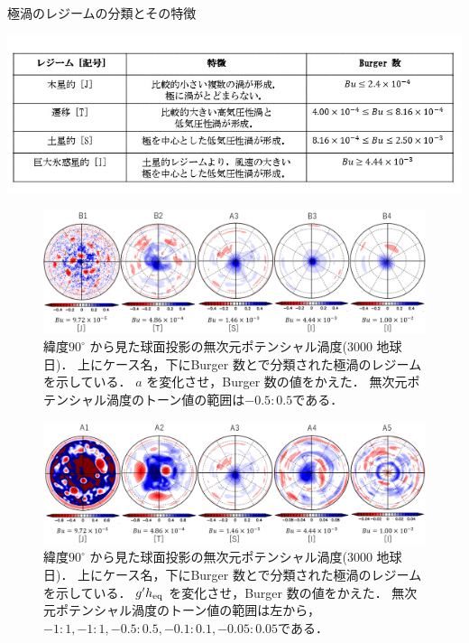 \documentclass[a4j,12pt,openbib,oneside]{jreport}
\begin{document}
%
\begin{table}[h]
  \caption{極渦のレジームの分類とその特徴}
  \label{table:regime}
  \begin{center}
    \includegraphics[clip,width=15cm]{./fig/model/table_regime.jpg}
  \end{center}
\end{table}
%
\begin{figure}[ht]
  \begin{center}
    \includegraphics[clip,width=14cm]{./fig/result/case1/case1_nonqv_a.png}
    \caption{
      \footnotesize{緯度$90^\circ$ から見た球面投影の無次元ポテンシャル渦度(3000 地球日)．
上にケース名，下にBurger 数と\cite{Brueshaber2019}で分類された極渦のレジームを示している．
$a$ を変化させ，Burger 数の値をかえた．
無次元ポテンシャル渦度のトーン値の範囲は$-0.5:0.5$である．
      }
    }
    \label{fig:case1_nonqv_a}
  \end{center}
\end{figure}
%
\begin{figure}[ht]
  \begin{center}
    \includegraphics[clip,width=14cm]{./fig/result/case1/case1_nonqv_gh.png}
    \caption{
      \footnotesize{緯度$90^\circ$ から見た球面投影の無次元ポテンシャル渦度(3000 地球日)．
上にケース名，下にBurger 数と\cite{Brueshaber2019}で分類された極渦のレジームを示している．
$g'h_{\rm{eq}}$ を変化させ，Burger 数の値をかえた．
無次元ポテンシャル渦度のトーン値の範囲は左から，$-1:1, -1:1, -0.5:0.5, -0.1:0.1, -0.05:0.05$である．
      }
    }
    \label{fig:case1_nonqv_gh}
  \end{center}
\end{figure}
\end{document}
